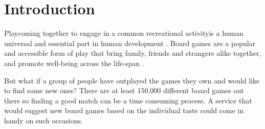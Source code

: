 \documentclass[a4paper,12pt,bibliography=totoc,numbers=noenddot,sfdefaults=false,abstract=true,notitlepage]{scrartcl} %
\begin{document}
	
	
	\begin{singlespace}
	\maketitle %
		
				
				
		
	\end{singlespace}


	
	
	\section{Introduction}\label{intro}
	
	Play\textemdash coming together to engage in a common recreational activity\textemdash is a human universal \autocite{brownHumanUniversalsHuman2004} and essential part in human development \autocite{smithPlayTypesFunctions2005,pellegriniRolePlayHuman2009}. Board games are a popular and accessible form of play that bring family, friends and strangers alike together, and promote well-being across the life-span \autocite{dellangelaBoardGamesEmotional2020,solway2011wellness}.

	But what if a group of people have outplayed the games they own and would like to find some new ones? There are at least 150.000 different board games out there \autocite{wordsratedBoardGamesStatistics2025} so finding a good match can be a time consuming process. A service that would suggest new board games based on the individual taste could come in handy on such occasions.
	
\end{document}
